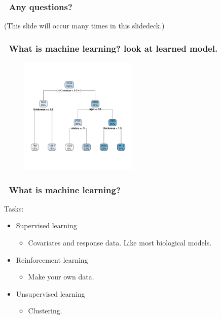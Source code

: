 \documentclass[handout, aspectratio = 169]{beamer}
\begin{document}
\begin{frame}
\frametitle{\insertframenumber~Any questions?}

(This slide will occur many times in this slidedeck.)

\end{frame} 



\begin{frame}
\frametitle{\insertframenumber~What is machine learning? look at learned model.}
\vspace{-4mm}
\begin{figure}
    \includegraphics[width = 0.5\textwidth]{rpart_tree.pdf}
\end{figure} 

\end{frame} 





\begin{frame}
\frametitle{\insertframenumber~What is machine learning?}
Tasks:
\begin{itemize}
\item Supervised learning
\begin{itemize}
\item Covariates and response data. Like most biological models.
\end{itemize}
\item Reinforcement learning
\begin{itemize}
\item Make your own data.
\end{itemize}
\item Unsupervised learning
\begin{itemize}
\item Clustering.
\end{itemize}
\end{itemize}
\end{frame} 
\end{document}
